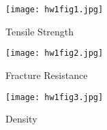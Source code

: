 \documentclass[paper=a4, fontsize=12pt]{scrartcl} %
\numberwithin{equation}{section} %
\numberwithin{figure}{section} %
\numberwithin{table}{section} %
\begin{document}
\begin{figure}
  \caption{Tensile Strength}
  \centering
    \texttt{[image: hw1fig1.jpg]}
\end{figure}
\begin{figure}
  \caption{Fracture Resistance}
  \centering
    \texttt{[image: hw1fig2.jpg]}
\end{figure}
\begin{figure}
  \caption{Density}
  \centering
    \texttt{[image: hw1fig3.jpg]}
\end{figure}

\newpage

\end{document}

